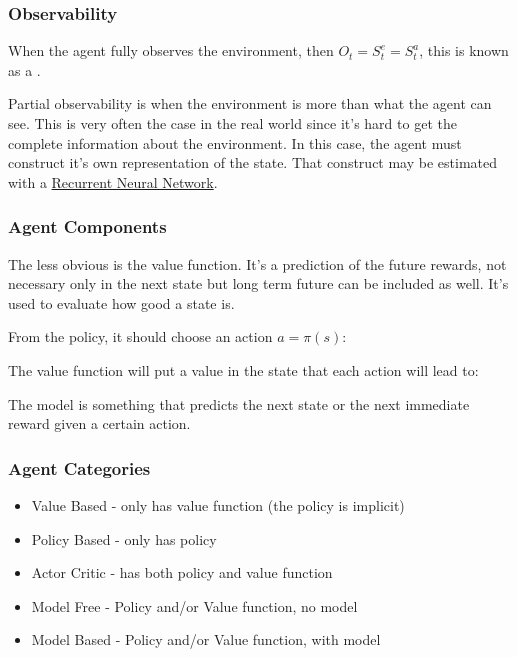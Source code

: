 \subsubsection{Observability}
When the agent fully observes the environment, then $O_t = S_t^e = S_t^a$, this is known as a .

Partial observability is when the environment is more than what the agent can see. This is very often the case in the real world since it's hard to get the complete information about the environment. In this case, the agent must construct it's own representation of the state. That construct may be estimated with a \ul{Recurrent Neural Network}.

\subsubsection{Agent Components}


The less obvious is the value function. It's a prediction of the future rewards, not necessary only in the next state but long term future can be included as well. It's used to evaluate how good a state is.

From the policy, it should choose an action $a = \pi(s)$: 



The value function will put a value in the state that each action will lead to:




The model is something that predicts the next state or the next immediate reward given a certain action.


\subsubsection{Agent Categories}
\begin{itemize}
    \item Value Based - only has value function (the policy is implicit)
    \item Policy Based - only has policy
    \item Actor Critic - has both policy and value function
    \item Model Free -  Policy and/or Value function, no model
    \item Model Based - Policy and/or Value function, with model
\end{itemize}

